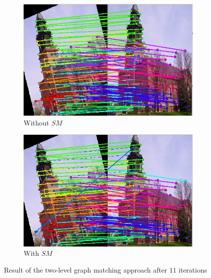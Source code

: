 \documentclass[
	fontsize=12pt,
	paper=a4,
	twoside=false,
	numbers=noenddot,
	plainheadsepline,
	toc=listof,
	toc=bibliography
]{scrartcl}
\begin{document}
\begin{figure}[ht] 
	\begin{subfigure}[b]{0.5\textwidth}
		\centering
		\includegraphics[scale=0.35]{fig/method1/test2/LL_it11.jpg} 
		\caption{Without $SM$} 
	\end{subfigure}%
	\begin{subfigure}[b]{0.5\textwidth}
		\centering
		\includegraphics[scale=0.35]{fig/method2/test2/LL_it11.jpg} 
		\caption{With $SM$} 
	\end{subfigure} 
	\caption{Result of the two-level graph matching approach after $11$ iterations }	
\end{figure}
\end{document}
